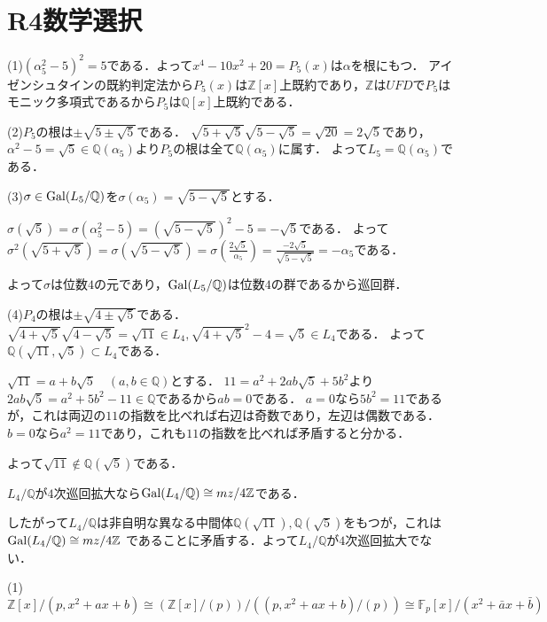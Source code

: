\documentclass[
		book,
		head_space=20mm,
		foot_space=20mm,
		gutter=10mm,
		line_length=190mm
]{jlreq}
\begin{document}
\section{R4数学選択}
(1)$(\alpha_5^2-5)^2=5$である．よって$x^4-10x^2+20=P_5(x)$は$\alpha$を根にもつ．
アイゼンシュタインの既約判定法から$P_5(x)$は$\mathbb{Z}[x]$上既約であり，$\mathbb{Z}$は$UFD$で$P_5$はモニック多項式であるから$P_5$は$\mathbb{Q}[x]$上既約である．

(2)$P_5$の根は$\pm\sqrt{5\pm\sqrt{5}}$である．
$\sqrt{5+\sqrt{5}}\sqrt{5-\sqrt{5}}=\sqrt{20}=2\sqrt{5}$であり，$\alpha^2-5=\sqrt{5}\in \mathbb{Q}(\alpha_5)$より$P_5$の根は全て$\mathbb{Q}(\alpha_5)$に属す．
よって$L_5=\mathbb{Q}(\alpha_5)$である．

(3)$\sigma\in \mathop{\mathrm{Gal}}(L_5/\mathbb{Q})$を$\sigma(\alpha_5)=\sqrt{5-\sqrt{5}}$とする．

$\sigma(\sqrt{5})=\sigma(\alpha_5^2-5)=(\sqrt{5-\sqrt{5}})^2-5=-\sqrt{5}$である．
よって$\sigma^2(\sqrt{5+\sqrt{5}})=\sigma(\sqrt{5-\sqrt{5}})=\sigma(\frac{2\sqrt{5}}{\alpha_5})=\frac{-2\sqrt{5}}{\sqrt{5-\sqrt{5}}}=-\alpha_5$である．

よって$\sigma$は位数$4$の元であり，$\mathop{\mathrm{Gal}}(L_5/\mathbb{Q})$は位数$4$の群であるから巡回群．

(4)$P_4$の根は$\pm\sqrt{4\pm \sqrt{5}}$である．
$\sqrt{4+\sqrt{5}}\sqrt{4-\sqrt{5}}=\sqrt{11}\in L_4,\sqrt{4+\sqrt{5}}^2-4=\sqrt{5}\in L_4$である．
よって$\mathbb{Q}(\sqrt{11},\sqrt{5})\subset L_4$である．

$\sqrt{11}=a+b\sqrt{5}\quad(a,b\in \mathbb{Q})$とする．
$11=a^2+2ab\sqrt{5}+5b^2$より$2ab\sqrt{5}=a^2+5b^2-11\in \mathbb{Q}$であるから$ab=0$である．
$a=0$なら$5b^2=11$であるが，これは両辺の$11$の指数を比べれば右辺は奇数であり，左辺は偶数である．
$b=0$なら$a^2=11$であり，これも$11$の指数を比べれば矛盾すると分かる．

よって$\sqrt{11}\notin \mathbb{Q}(\sqrt{5})$である．

$L_4/\mathbb{Q}$が$4$次巡回拡大なら$\mathop{\mathrm{Gal}}(L_4/\mathbb{Q})\cong mz
/ 4 \mathbb{Z}$である．

したがって$L_4/\mathbb{Q}$は非自明な異なる中間体$\mathbb{Q}(\sqrt{11}),\mathbb{Q}(\sqrt{5})$をもつが，これは$\mathop{\mathrm{Gal}}(L_4/\mathbb{Q})\cong mz
/ 4 \mathbb{Z}$ であることに矛盾する．よって$L_4/\mathbb{Q}$が$4$次巡回拡大でない．

(1)$
    \mathbb{Z}[x]/(p,x^2+ax+b)\cong (\mathbb{Z}[x]/(p))/((p,x^2+ax+b)/(p))\cong \mathbb{F}_p[x]/(x^2+\bar{a}x+\bar{b})
$
\end{document}
